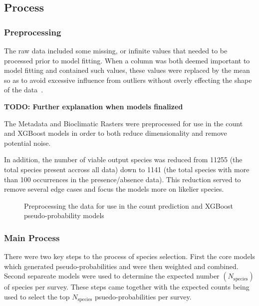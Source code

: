 \subsection{Process}

\subsubsection{Preprocessing}

The raw data included some missing, or infinite values that needed to be processed prior to model fitting. When a column was both deemed important to model fitting and contained such values, these values were replaced by the mean so as to avoid excessive influence from outliers without overly effecting the shape of the data~\cite{missingmedian}.

\textbf{TODO: Further explanation when models finalized}

The Metadata and Bioclimatic Rasters were preprocessed for use in the count and XGBoost models in order to both reduce dimensionality and remove potential noise.




In addition, the number of viable output species was reduced from 11255 (the total species present accross all data) down to 1141 (the total species with more than 100 occurrences in the presence/absence data). 
This reduction served to remove several edge cases and focus the models more on likelier species.

\begin{figure}\label{fig:preproc}
    \begin{center}
        
        \caption{Preprocessing the data for use in the count prediction and XGBoost pseudo-probability models}
    \end{center}
\end{figure}



\subsubsection{Main Process}
\newcommand{\nspecies}{N_{\text{species}}}

There were two key steps to the process of species selection. First the core models which generated pseudo-probabilities and were then weighted and combined. 
Second separeate models were used to determine the expected number $(\nspecies)$ of species per survey. 
These steps came together with the expected counts being used to select the top  $\nspecies$ psuedo-probabilities per survey.


